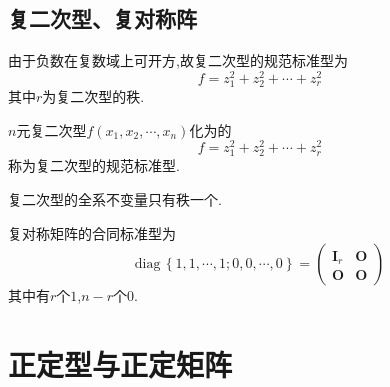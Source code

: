 \subsection{复二次型、复对称阵}
由于负数在复数域上可开方,故复二次型的规范标准型为\[
f=z_1^2+z_2^2+\cdots+z_r^2
\]其中$r$为复二次型的秩.
\begin{formal}
    \begin{definition}[复二次型的规范标准型]\label{def:复二次型的规范标准型}
        $n$元复二次型$f\left(
            x_1,x_2,\cdots,x_n
        \right)$化为的\[
        f=z_1^2+z_2^2+\cdots+z_r^2
        \]称为复二次型的规范标准型.
    \end{definition}
\end{formal}
\begin{formal}
    \begin{theorem}[复二次型的全系不变量]\label{thm:复二次型的全系不变量}
        复二次型的全系不变量只有秩一个.
    \end{theorem}
\end{formal}
\begin{formal}
    \begin{theorem}[复对称矩阵的合同标准型]\label{thm:复对称矩阵的合同标准型}
        复对称矩阵的合同标准型为\[
        \mathrm{diag}\,\left\{
            1,1,\cdots,1;0,0,\cdots,0
        \right\}=\begin{pmatrix}
            \bm{I}_r&\bm{O}\\
            \bm{O}&\bm{O}
        \end{pmatrix}
        \]其中有$r$个$1$,$n-r$个$0$.
    \end{theorem}
\end{formal}
\newpage
\section{正定型与正定矩阵}
